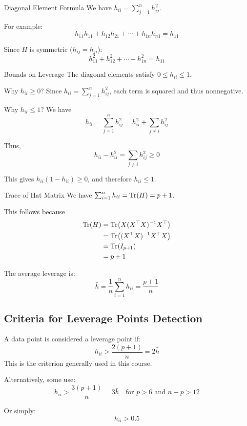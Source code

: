 \begin{prop}{Diagonal Element Formula}
We have $h_{ii} = \sum_{j=1}^{n} h_{ij}^2$.

For example:
\[
h_{11}h_{11} + h_{12}h_{21} + \cdots + h_{1n}h_{n1} = h_{11}
\]

Since $H$ is symmetric ($h_{ij} = h_{ji}$):
\[
h_{11}^2 + h_{12}^2 + \cdots + h_{1n}^2 = h_{11}
\]
\end{prop}

\begin{prop}{Bounds on Leverage}
The diagonal elements satisfy $0 \le h_{ii} \le 1$.

Why $h_{ii} \ge 0$? Since $h_{ii} = \sum_{j=1}^{n} h_{ij}^2$, each term is squared and thus nonnegative.

Why $h_{ii} \le 1$? We have
\[
h_{ii} = \sum_{j=1}^{n} h_{ij}^2 = h_{ii}^2 + \sum_{j \ne i} h_{ij}^2
\]

Thus,
\[
h_{ii} - h_{ii}^2 = \sum_{j \ne i} h_{ij}^2 \ge 0
\]

This gives $h_{ii}(1 - h_{ii}) \ge 0$, and therefore $h_{ii} \le 1$.
\end{prop}

\begin{prop}{Trace of Hat Matrix}
We have $\sum_{i=1}^{n} h_{ii} = \operatorname{Tr}(H) = p + 1$.

This follows because
\begin{align*}
\operatorname{Tr}(H)
&= \operatorname{Tr}\!\left( X (X^\top X)^{-1} X^\top \right) \\
&= \operatorname{Tr}\!\left( (X^\top X)^{-1} X^\top X \right) \\
&= \operatorname{Tr}(I_{p+1}) \\
&= p+1
\end{align*}
\end{prop}

\begin{keyresult}
The average leverage is:
\[
\bar{h} = \frac{1}{n} \sum_{i=1}^{n} h_{ii} = \frac{p+1}{n}
\]
\end{keyresult}

\subsection{Criteria for Leverage Points Detection}

\begin{keyresult}
A data point is considered a leverage point if:
\[
h_{ii} > \frac{2(p+1)}{n} = 2\bar{h}
\]
This is the criterion generally used in this course.

Alternatively, some use:
\[
h_{ii} > \frac{3(p+1)}{n} = 3\bar{h}
\quad \text{for } p > 6 \text{ and } n - p > 12
\]

Or simply:
\[
h_{ii} > 0.5
\]
\end{keyresult}

